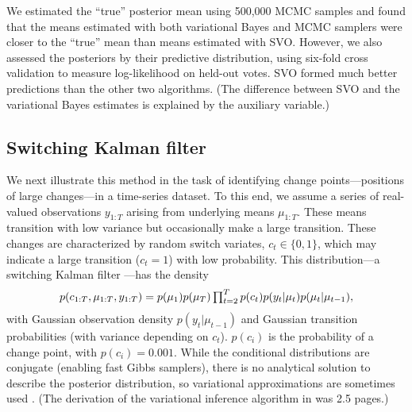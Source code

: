 We estimated the ``true'' posterior mean using 500,000 MCMC samples
and found that the means estimated with both variational Bayes and
MCMC samplers were closer to the ``true'' mean than means estimated
with SVO.  However, we also assessed the posteriors by their
predictive distribution, using six-fold cross validation to measure
log-likelihood on held-out votes.  SVO formed much better predictions
than the other two algorithms. (The difference between SVO and the
variational Bayes estimates is explained by the auxiliary variable.)


\subsection{Switching Kalman filter}
\label{section:switching_kalman_filter}
We next illustrate this method in the task of identifying change
points---positions of large changes---in a time-series dataset.  To
this end, we assume a series of real-valued observations $y_{1:T}$
arising from underlying means $\mu_{1:T}$.  These means transition
with low variance but occasionally make a large transition.  These changes
are characterized by random switch variates, $c_t \in \{ 0, 1 \}$,
which may indicate a large transition ($c_t=1$) with low probability. This
distribution---a switching Kalman filter \cite{murphy:1998}---has the
density
\begin{align}
  \vspace{-14pt}
  p(c_{1:T}, \mu_{1:T}, y_{1:T}) = p(\mu_1) p(\mu_T) \textstyle
  \prod_{t=2}^T p(c_t) p(y_t | \mu_t) p(\mu_t | \mu_{t-1}),
\end{align}
with Gaussian observation density $p(y_t | \mu_{t-1})$ and Gaussian
transition probabilities (with variance depending on $c_t$).  $p(c_i)$
is the probability of a change point, with $p(c_i) = 0.001$. While the
conditional distributions are conjugate (enabling fast Gibbs
samplers), there is no analytical solution to describe the posterior
distribution, so variational approximations are sometimes used
\cite{ghahramani:1996,murphy:1998}.  (The derivation of the
variational inference algorithm in \cite{ghahramani:1996} was 2.5
pages.)

